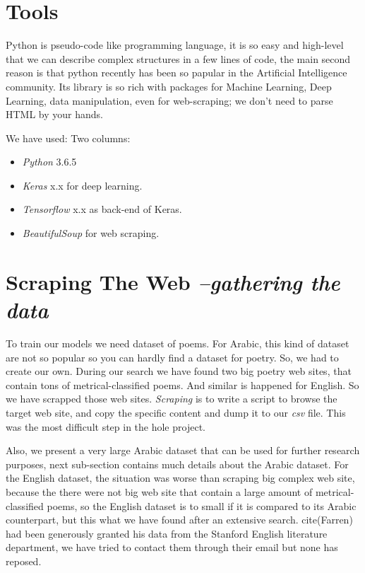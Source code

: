 \documentclass[12pt]{report}
\begin{document}
\section{Tools}
Python is pseudo-code like programming language, it is so easy and high-level
that we can describe complex structures in a few lines of code, the main second
reason is that python recently has been so papular in the Artificial Intelligence
community. Its library is so rich with packages for Machine Learning, Deep
Learning, data manipulation, even for web-scraping; we don't need to parse HTML
by your hands.

We have used:
Two columns:
    \begin{multicols}{2}
\begin{itemize}
\item \textit{Python} 3.6.5
\item \textit{Keras} x.x for deep learning.
\item \textit{Tensorflow} x.x as back-end of Keras.
\item \textit{BeautifulSoup} for web scraping.
\end{itemize}
    \end{multicols}







\section{Scraping The Web \textit{\small --gathering the data}}
To train our models we need dataset of poems. For Arabic, this kind of dataset
are not so popular so you can hardly find a dataset for poetry. So, we had to
create our own. During our search we have found two big poetry web sites, that
contain tons of metrical-classified poems. And similar is happened for English.
So we have scrapped those web sites. \textit{Scraping} is to write a script to
browse the target web site, and copy the specific content and dump it to our
\textit{csv} file. This was the most difficult step in the hole project. 
 
Also, we present a very large Arabic dataset that can be used for further
research purposes, next sub-section contains much details about the Arabic
dataset. For the English dataset, the situation was worse than scraping big
complex web site, because the there were not big web site that contain a large
amount of metrical-classified poems, so the English dataset is to small if it is
compared to its Arabic counterpart, but this what we have found after an
extensive search. 
cite(Farren) had been generously granted his data from the
Stanford English literature department, we have tried to contact them through
their email but none has reposed.
\end{document}
